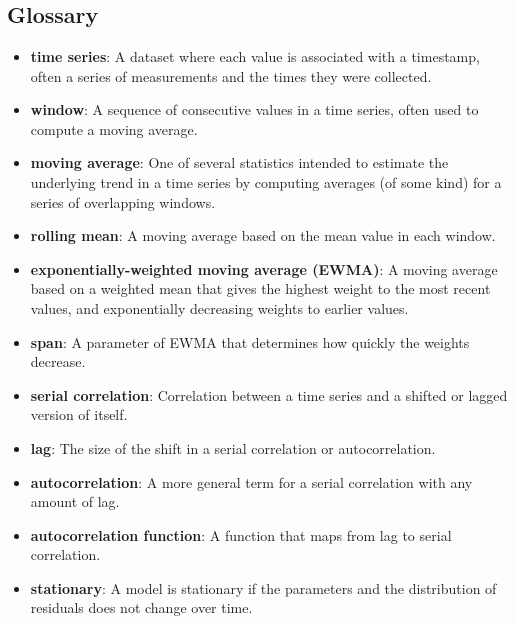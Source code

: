  \chapter{ }  \section*{Glossary} \begin{itemize}
	
	\item {\bf time series}: A dataset where each value is associated with
	a timestamp, often a series of measurements and the times they
	were collected.
	
	\item {\bf window}: A sequence of consecutive values in a time series,
	often used to compute a moving average.
	
	\item {\bf moving average}: One of several statistics intended to estimate
	the underlying trend in a time series by computing averages (of
	some kind) for a series of overlapping windows.
	
	\item {\bf rolling mean}: A moving average based on the mean value in
	each window.
	
	\item {\bf exponentially-weighted moving average (EWMA)}: A moving
	average based on a weighted mean that gives the highest weight
	to the most recent values, and exponentially decreasing weights
	to earlier values.  
	
	\item {\bf span}: A parameter of EWMA that determines how quickly the
	weights decrease.
	
	\item {\bf serial correlation}: Correlation between a time series and
	a shifted or lagged version of itself.
	
	\item {\bf lag}: The size of the shift in a serial correlation or
	autocorrelation.
	
	\item {\bf autocorrelation}: A more general term for a serial correlation
	with any amount of lag.
	
	\item {\bf autocorrelation function}: A function that maps from lag to
	serial correlation.
	
	\item {\bf stationary}: A model is stationary if the parameters and the
	distribution of residuals does not change over time.
	
\end{itemize}

